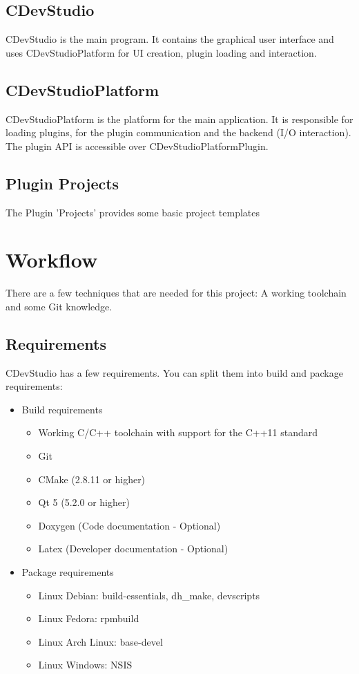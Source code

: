 \documentclass{article}
\begin{document}
\subsection{CDevStudio}
CDevStudio is the main program. It contains the graphical user interface and uses CDevStudioPlatform for UI creation, plugin loading and interaction.

\subsection{CDevStudioPlatform}
CDevStudioPlatform is the platform for the main application. It is responsible for loading plugins, for the plugin communication and the backend (I/O interaction). The plugin API is accessible over CDevStudioPlatformPlugin.

\subsection{Plugin Projects}
The Plugin 'Projects' provides some basic project templates

\section{Workflow}
There are a few techniques that are needed for this project: A working toolchain and some Git knowledge.

\subsection{Requirements}
CDevStudio has a few requirements. You can split them into build and package requirements:

\begin{itemize}
	\item Build requirements
	\begin{itemize}
		\item Working C/C++ toolchain with support for the C++11 standard
		\item Git
		\item CMake (2.8.11 or higher)
		\item Qt 5 (5.2.0 or higher)
		\item Doxygen (Code documentation - Optional)
		\item Latex (Developer documentation - Optional)
	\end{itemize}
	\item Package requirements
	\begin{itemize}
		\item Linux Debian: build-essentials, dh_make, devscripts
		\item Linux Fedora: rpmbuild
		\item Linux Arch Linux: base-devel
		\item Linux Windows: NSIS
	\end{itemize}
\end{itemize}
\end{document}
